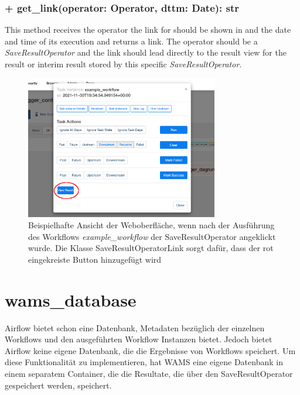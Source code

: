 \subsubsection{+ get\_link(operator: Operator,  dttm: Date): str}
This method receives the operator the link for should be shown in and the date and time of its execution and returns a link. The operator should be a \textit{SaveResultOperator} and the link should lead directly to the result view for the result or interim result stored by this specific \textit{SaveResultOperator}.

\begin{figure} [h]
    \centering
    \includegraphics[width = 0.75\textwidth]{Grafiken/operator_extra_link.png}
    \caption{Beispielhafte Ansicht der Weboberfläche, wenn nach der Ausführung des Workflows \textit{example\_workflow} der SaveResultOperator angeklickt wurde. Die Klasse SaveResultOperatorLink sorgt dafür, dass der rot eingekreiste Button hinzugefügt wird}
    \label{fig:expSaveLink}
\end{figure}

\section{wams\_database}
Airflow bietet schon eine Datenbank, Metadaten bezüglich der einzelnen Workflows und den
ausgeführten Workflow Instanzen bietet. Jedoch bietet Airflow keine eigene Datenbank, die die
Ergebnisse von Workflows speichert. Um diese Funktionalität zu implementieren, hat WAMS eine
eigene Datenbank in einem separatem Container, die die Resultate, die über den SaveResultOperator gespeichert werden, speichert. %

